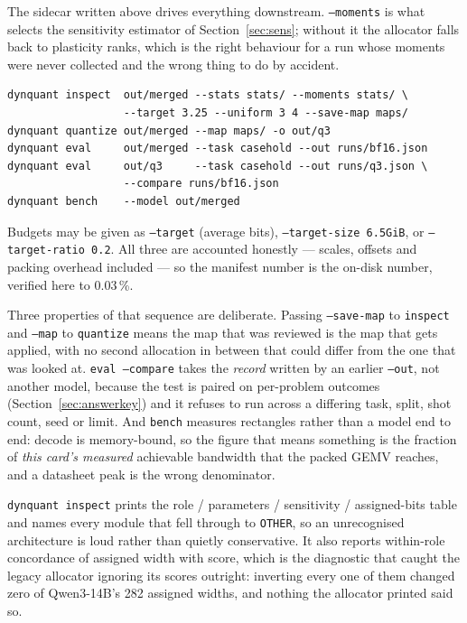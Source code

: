 \documentclass[11pt]{article}
\newcommand{\pct}{\,\%}
\newcommand{\code}[1]{\texttt{#1}}
\begin{document}
The sidecar written above drives everything downstream. \code{--moments} is what selects the
sensitivity estimator of Section~\ref{sec:sens}; without it the allocator falls back to
plasticity ranks, which is the right behaviour for a run whose moments were never collected and
the wrong thing to do by accident.

\begin{verbatim}
dynquant inspect  out/merged --stats stats/ --moments stats/ \
                  --target 3.25 --uniform 3 4 --save-map maps/
dynquant quantize out/merged --map maps/ -o out/q3
dynquant eval     out/merged --task casehold --out runs/bf16.json
dynquant eval     out/q3     --task casehold --out runs/q3.json \
                  --compare runs/bf16.json
dynquant bench    --model out/merged
\end{verbatim}

Budgets may be given as \code{--target} (average bits), \code{--target-size 6.5GiB}, or
\code{--target-ratio 0.2}. All three are accounted honestly --- scales, offsets and packing
overhead included --- so the manifest number is the on-disk number, verified here to 0.03\pct.

Three properties of that sequence are deliberate. Passing \code{--save-map} to \code{inspect} and
\code{--map} to \code{quantize} means the map that was reviewed is the map that gets applied,
with no second allocation in between that could differ from the one that was looked at.
\code{eval --compare} takes the \emph{record} written by an earlier \code{--out}, not another
model, because the test is paired on per-problem outcomes (Section~\ref{sec:answerkey}) and it
refuses to run across a differing task, split, shot count, seed or limit. And \code{bench}
measures rectangles rather than a model end to end: decode is memory-bound, so the figure that
means something is the fraction of \emph{this card's measured} achievable bandwidth that the
packed GEMV reaches, and a datasheet peak is the wrong denominator.

\code{dynquant inspect} prints the role / parameters / sensitivity / assigned-bits table and names
every module that fell through to \code{OTHER}, so an unrecognised architecture is loud rather
than quietly conservative. It also reports within-role concordance of assigned width with score,
which is the diagnostic that caught the legacy allocator ignoring its scores outright: inverting
every one of them changed zero of Qwen3-14B's 282 assigned widths, and nothing the allocator
printed said so.
\end{document}
